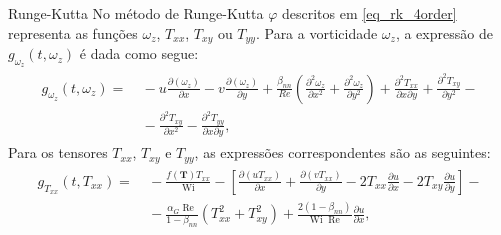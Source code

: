\begin{frame}{Runge-Kutta}
No método de Runge-Kutta $\varphi$ descritos em \ref{eq_rk_4order} representa as funções $\omega_{z}$, $T_{xx}$, $T_{xy}$ ou $T_{yy}$. Para a vorticidade $\omega_{z}$, a expressão de $g_{\omega_{z}}(t, \omega_{z})$ é dada como segue:
\begin{gather}
    \begin{aligned}
        g_{\omega_{z}}\left(t, \omega_z\right) = &~- u\frac{\partial\left(\omega_{z}\right)}{\partial x} - v \frac{\partial\left(\omega_{z}\right)}{\partial y} + \frac{\beta_{nn}}{R e}\left(\frac{\partial^2 \omega_{z}}{\partial x^2} + \frac{\partial^2 \omega_{z}}{\partial y^2}\right) + \frac{\partial^2 T_{x x}}{\partial x \partial y} + \frac{\partial^2 T_{x y}}{\partial y^2} - \\ &~- \frac{\partial^2 T_{x y}}{\partial x^2} - \frac{\partial^2 T_{y y}}{\partial x \partial y},
    \end{aligned}
\end{gather}
Para os tensores $T_{xx}$, $T_{xy}$ e $T_{yy}$, as expressões correspondentes são as seguintes:
\begin{gather}
    \begin{aligned}
        g_{T_{xx}}\left(t, T_{xx}\right) = &~- \frac{f(\mathbf{T})T_{xx}}{\operatorname{Wi}} - \left[\frac{\partial (uT_{xx})}{\partial x} + \frac{\partial (vT_{xx})}{\partial y} - 2T_{xx}\frac{\partial u}{\partial x} - 2T_{xy}\frac{\partial u}{\partial y}\right] - \\ &~- \frac{\alpha_{G}\operatorname{Re}}{1-\beta_{nn}}\left(T_{xx}^{2} + T_{xy}^{2}\right) + \frac{2(1-\beta_{nn})}{\operatorname{Wi}\operatorname{Re}}\frac{\partial u}{\partial x},\label{eq_gies_txx_steps_rk}
    \end{aligned}
\end{gather}
\end{frame}

